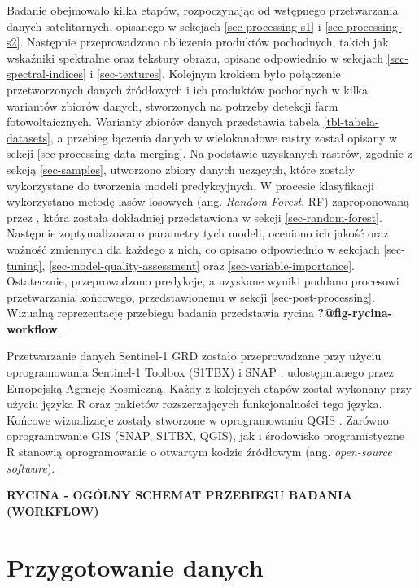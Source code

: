 \documentclass{amuthesis}
\begin{document}
Badanie obejmowało kilka etapów, rozpoczynając od wstępnego
przetwarzania danych satelitarnych, opisanego w sekcjach
\ref{sec-processing-s1} i \ref{sec-processing-s2}. Następnie
przeprowadzono obliczenia produktów pochodnych, takich jak wskaźniki
spektralne oraz tekstury obrazu, opisane odpowiednio w sekcjach
\ref{sec-spectral-indices} i \ref{sec-textures}. Kolejnym krokiem było
połączenie przetworzonych danych źródłowych i ich produktów pochodnych w
kilka wariantów zbiorów danych, stworzonych na potrzeby detekcji farm
fotowoltaicznych. Warianty zbiorów danych przedstawia tabela
\ref{tbl-tabela-datasets}, a przebieg łączenia danych w wielokanałowe
rastry został opisany w sekcji \ref{sec-processing-data-merging}. Na
podstawie uzyskanych rastrów, zgodnie z sekcją \ref{sec-samples},
utworzono zbiory danych uczących, które zostały wykorzystane do
tworzenia modeli predykcyjnych. W procesie klasyfikacji wykorzystano
metodę lasów losowych (ang. \emph{Random Forest}, RF) zaproponowaną
przez \textcite{breiman_2001_rf}, która została dokładniej przedstawiona
w sekcji \ref{sec-random-forest}. Następnie zoptymalizowano parametry
tych modeli, oceniono ich jakość oraz ważność zmiennych dla każdego z
nich, co opisano odpowiednio w sekcjach \ref{sec-tuning},
\ref{sec-model-quality-assessment} oraz \ref{sec-variable-importance}.
Ostatecznie, przeprowadzono predykcje, a uzyskane wyniki poddano
procesowi przetwarzania końcowego, przedstawionemu w sekcji
\ref{sec-post-processing}. Wizualną reprezentację przebiegu badania
przedstawia rycina \textbf{?@fig-rycina-workflow}.

Przetwarzanie danych Sentinel-1 GRD zostało przeprowadzane przy użyciu
oprogramowania Sentinel-1 Toolbox (S1TBX) \autocite{s1tbx} i SNAP
\autocite{snap}, udostępnianego przez Europejską Agencję Kosmiczną.
Każdy z kolejnych etapów został wykonany przy użyciu języka R
\autocite{R-base} oraz pakietów rozszerzających funkcjonalności tego
języka. Końcowe wizualizacje zostały stworzone w oprogramowaniu QGIS
\autocite{qgis}. Zarówno oprogramowanie GIS (SNAP, S1TBX, QGIS), jak i
środowisko programistyczne R stanowią oprogramowanie o otwartym kodzie
źródłowym (ang. \emph{open-source software}).

\textbf{RYCINA - OGÓLNY SCHEMAT PRZEBIEGU BADANIA (WORKFLOW)}

\hypertarget{sec-processing}{%
\section{Przygotowanie danych}\label{sec-processing}}
\end{document}
